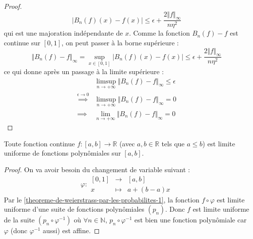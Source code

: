 \begin{proof}
		\[ |B_n(f)(x) - f(x)| \leq \epsilon + \frac{2 \Vert f \Vert_\infty}{n \eta^2} \]
		qui est une majoration indépendante de $x$. Comme la fonction $B_n(f) - f$ est continue sur $[0, 1]$, on peut passer à la borne supérieure :
		\[ \Vert B_n(f) - f \Vert_\infty = \sup_{x \in [0, 1]} |B_n(f)(x) - f(x)| \leq \epsilon + \frac{2 \Vert f \Vert_\infty}{n \eta^2} \]
		ce qui donne après un passage à la limite supérieure :
		\begin{align*}
			&\limsup_{n \rightarrow +\infty} \Vert B_n(f) - f \Vert_\infty \leq \epsilon \\
			\overset{\epsilon \longrightarrow 0}{\implies} &\limsup_{n \rightarrow +\infty} \Vert B_n(f) - f \Vert_\infty = 0 \\
			\implies &\lim_{n \rightarrow +\infty} \Vert B_n(f) - f \Vert_\infty = 0
		\end{align*}
	\end{proof}

	\begin{theorem}[Weierstrass]
		Toute fonction continue $f : [a,b] \rightarrow \mathbb{R}$ (avec $a, b \in \mathbb{R}$ tels que $a \leq b$) est limite uniforme de fonctions polynômiales sur $[a, b]$.
	\end{theorem}

	\begin{proof}
		On va avoir besoin du changement de variable suivant :
		\[ \varphi :
		\begin{array}{ccc}
			[0,1] &\rightarrow& [a, b] \\
			x &\mapsto& a + (b-a) x
		\end{array}
		\]
		Par le \cref{theoreme-de-weierstrass-par-les-probabilites-1}, la fonction $f \circ \varphi$ est limite uniforme d'une suite de fonctions polynômiales $(p_n)$. Donc $f$ est limite uniforme de la suite $(p_n \circ \varphi^{-1})$ où $\forall n \in \mathbb{N}$, $p_n \circ \varphi^{-1}$ est bien une fonction polynômiale car $\varphi$ (donc $\varphi^{-1}$ aussi) est affine.
	\end{proof}

